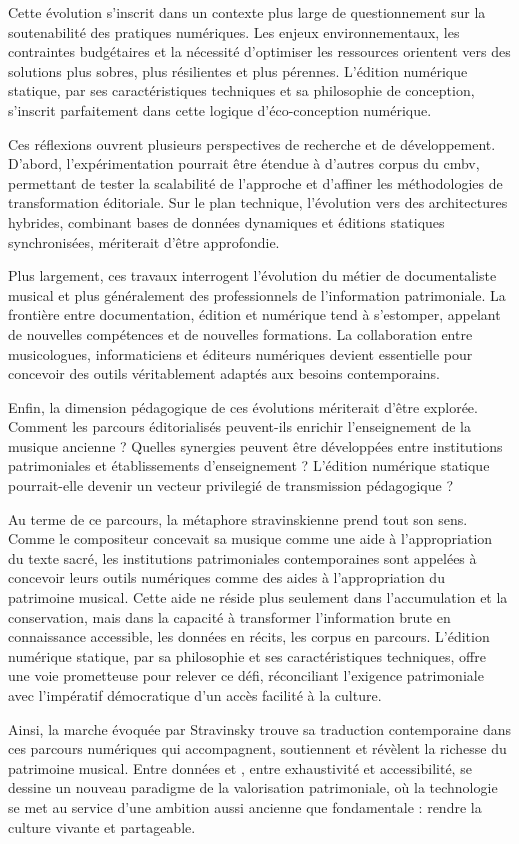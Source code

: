 Cette évolution s'inscrit dans un contexte plus large de questionnement sur la soutenabilité des pratiques numériques. Les enjeux environnementaux, les contraintes budgétaires et la nécessité d'optimiser les ressources orientent vers des solutions plus sobres, plus résilientes et plus pérennes. L'édition numérique statique, par ses caractéristiques techniques et sa philosophie de conception, s'inscrit parfaitement dans cette logique d'éco-conception numérique.

Ces réflexions ouvrent plusieurs perspectives de recherche et de développement. D'abord, l'expérimentation pourrait être étendue à d'autres corpus du \gls{cmbv}, permettant de tester la \gls{scalabilité} de l'approche et d'affiner les méthodologies de transformation éditoriale. Sur le plan technique, l'évolution vers des architectures hybrides, combinant bases de données dynamiques et éditions statiques synchronisées, mériterait d'être approfondie.

Plus largement, ces travaux interrogent l'évolution du métier de documentaliste musical et plus généralement des professionnels de l'information patrimoniale. La frontière entre documentation, édition et  numérique tend à s'estomper, appelant de nouvelles compétences et de nouvelles formations. La collaboration entre musicologues, informaticiens et éditeurs numériques devient essentielle pour concevoir des outils véritablement adaptés aux besoins contemporains.

Enfin, la dimension pédagogique de ces évolutions mériterait d'être explorée. Comment les parcours éditorialisés peuvent-ils enrichir l'enseignement de la musique ancienne ? Quelles synergies peuvent être développées entre institutions patrimoniales et établissements d'enseignement ? L'édition numérique statique pourrait-elle devenir un vecteur privilegié de transmission pédagogique ?

Au terme de ce parcours, la métaphore stravinskienne prend tout son sens. Comme le compositeur concevait sa musique comme une aide à l'appropriation du texte sacré, les institutions patrimoniales contemporaines sont appelées à concevoir leurs outils numériques comme des aides à l'appropriation du patrimoine musical. Cette aide ne réside plus seulement dans l'accumulation et la conservation, mais dans la capacité à transformer l'information brute en connaissance accessible, les données en récits, les corpus en parcours. L'édition numérique statique, par sa philosophie et ses caractéristiques techniques, offre une voie prometteuse pour relever ce défi, réconciliant l'exigence patrimoniale avec l'impératif démocratique d'un accès facilité à la culture.

Ainsi, la marche évoquée par Stravinsky trouve sa traduction contemporaine dans ces parcours numériques qui accompagnent, soutiennent et révèlent la richesse du patrimoine musical. Entre données et , entre exhaustivité et accessibilité, se dessine un nouveau paradigme de la valorisation patrimoniale, où la technologie se met au service d'une ambition aussi ancienne que fondamentale : rendre la culture vivante et partageable.